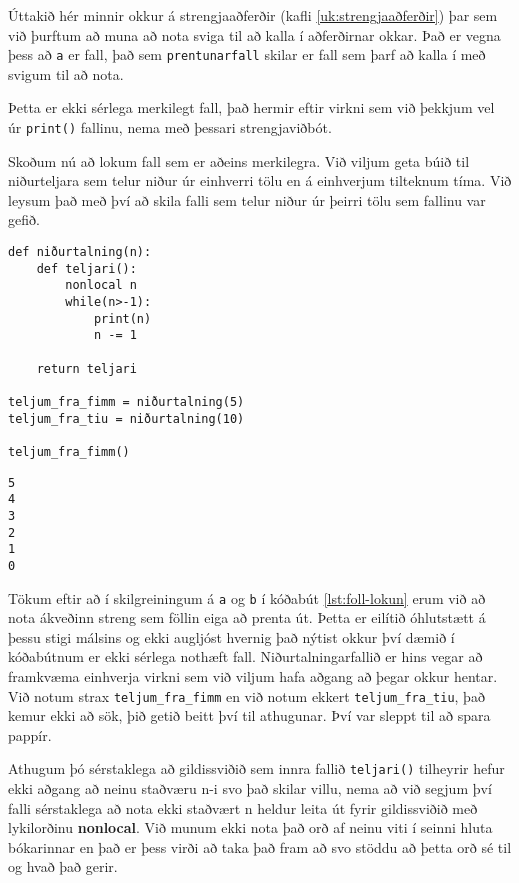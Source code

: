 Úttakið hér minnir okkur á strengjaaðferðir (kafli \ref{uk:strengjaaðferðir}) þar sem við þurftum að muna að nota sviga til að kalla í aðferðirnar okkar.
Það er vegna þess að \texttt{a} er fall, það sem \texttt{prentunarfall} skilar er fall sem þarf að kalla í með svigum til að nota.

Þetta er ekki sérlega merkilegt fall, það hermir eftir virkni sem við þekkjum vel úr \texttt{print()} fallinu, nema með þessari strengjaviðbót.

Skoðum nú að lokum fall sem er aðeins merkilegra.
Við viljum geta búið til niðurteljara sem telur niður úr einhverri tölu en á einhverjum tilteknum tíma.
Við leysum það með því að skila falli sem telur niður úr þeirri tölu sem fallinu var gefið.


\begin{lstlisting}[caption=Lokun notuð á hagnýtari máta, label=lst:foll-lokun2]
def niðurtalning(n):
	def teljari():
		nonlocal n
		while(n>-1):
			print(n)
			n -= 1
	
	return teljari
	
teljum_fra_fimm = niðurtalning(5)
teljum_fra_tiu = niðurtalning(10)

teljum_fra_fimm()
\end{lstlisting}
\lstset{style=uttak}
\begin{lstlisting}
5
4
3
2
1
0
\end{lstlisting}
\lstset{style=venjulegt}

Tökum eftir að í skilgreiningum á \texttt{a} og \texttt{b} í kóðabút \ref{lst:foll-lokun} erum við að nota ákveðinn streng sem föllin eiga að prenta út.
Þetta er eilítið óhlutstætt á þessu stigi málsins og ekki augljóst hvernig það nýtist okkur því dæmið í kóðabútnum er ekki sérlega nothæft fall.
Niðurtalningarfallið er hins vegar að framkvæma einhverja virkni sem við viljum hafa aðgang að þegar okkur hentar.
Við notum strax \texttt{teljum\_fra\_fimm} en við notum ekkert \texttt{teljum\_fra\_tiu}, það kemur ekki að sök, þið getið beitt því til athugunar.
Því var sleppt til að spara pappír.

Athugum þó sérstaklega að gildissviðið sem innra fallið \texttt{teljari()} tilheyrir hefur ekki aðgang að neinu staðværu n-i svo það skilar villu, nema að við segjum því falli sérstaklega að nota ekki staðvært n heldur leita út fyrir gildissviðið með lykilorðinu \textbf{nonlocal}.
Við munum ekki nota það orð af neinu viti í seinni hluta bókarinnar en það er þess virði að taka það fram að svo stöddu að þetta orð sé til og hvað það gerir.

